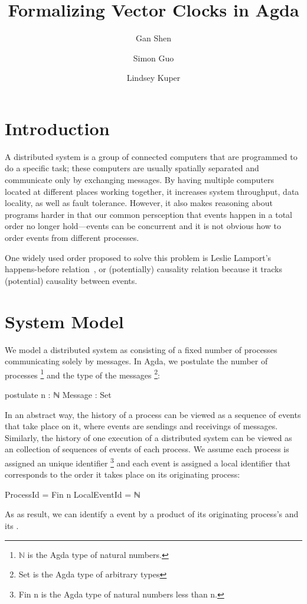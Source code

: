 \documentclass[acmsmall,review,anonymous]{acmart}
\title{Formalizing Vector Clocks in Agda}
\author{Gan Shen}
\affiliation{\institution{University of California, Santa Cruz} \country{USA}}
\author{Simon Guo}
\affiliation{\institution{University of California, Santa Cruz} \country{USA}}
\author{Lindsey Kuper}
\affiliation{\institution{University of California, Santa Cruz} \country{USA}}
\theoremstyle{definition}
\theoremstyle{theorem}
\begin{document}
\maketitle

\section{Introduction}
A distributed system is a group of connected computers that are
programmed to do a specific task; these computers are usually
spatially separated and communicate only by exchanging messages. By
having multiple computers located at different places working
together, it increases system throughput, data locality, as well as
fault tolerance. However, it also makes reasoning about programs
harder in that our common persception that events happen in a total
order no longer hold---events can be concurrent and it is not obvious
how to order events from different processes.

One widely used order proposed to solve this problem is Leslie
Lamport's happens-before relation~\cite{lamport1978}, or (potentially)
causality relation because it tracks (potential) causality between
events.

\section{System Model}
We model a distributed system as consisting of a fixed number of
processes communicating solely by messages. In Agda, we postulate the
number of processes \footnote{\ensuremath{\mathbb{N}} is
the Agda type of natural numbers.} and the type of the messages
\footnote{Set is the Agda type of arbitrary types}:
\begin{code}
postulate
  n : ℕ
  Message : Set
\end{code}
In an abstract way, the history of a process can be viewed as a
sequence of events that take place on it, where events are sendings
and receivings of messages. Similarly, the history of one execution of
a distributed system can be viewed as an collection of sequences of
events of each process. We assume each process is assigned an unique
identifier \footnote{Fin n is the Agda type of
natural numbers less than n.} and each event is assigned a local
identifier  that corresponds to the order it
takes place on its originating process:
\begin{code}
ProcessId = Fin n
LocalEventId = ℕ
\end{code}
\noindent As as result, we can identify
a event by a product of its originating process's 
and its .
\end{document}

